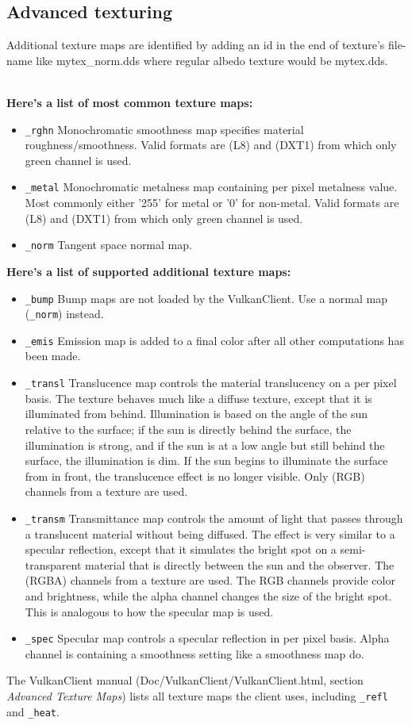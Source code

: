 \documentclass[Orbiter Developer Manual.tex]{subfiles}
\begin{document}
\subsection{Advanced texturing}
Additional texture maps are identified by adding an id in the end of texture's file-name like mytex\_norm.dds where regular albedo texture would be mytex.dds.\\\ 

\textbf{Here's a list of most common texture maps:}
\begin{itemize}
\item	\texttt{\_rghn} Monochromatic smoothness map specifies material roughness/smoothness. Valid formats are (L8) and (DXT1) from which only green channel is used.
\item	\texttt{\_metal} Monochromatic metalness map containing per pixel metalness value. Most commonly either '255' for metal or '0' for non-metal. Valid formats are (L8) and (DXT1) from which only green channel is used.
\item	\texttt{\_norm} Tangent space normal map. 
\end{itemize}

\textbf{Here's a list of supported additional texture maps:}
\begin{itemize}
\item	\texttt{\_bump} Bump maps are not loaded by the VulkanClient. Use a normal map (\texttt{\_norm}) instead.
\item	\texttt{\_emis} Emission map is added to a final color after all other computations has been made. 
\item	\texttt{\_transl} Translucence map controls the material translucency on a per pixel basis. The texture behaves much like a diffuse texture, except that it is illuminated from behind. Illumination is based on the angle of the sun relative to the surface; if the sun is directly behind the surface, the illumination is strong, and if the sun is at a low angle but still behind the surface, the illumination is dim. If the sun begins to illuminate the surface from in front, the translucence effect is no longer visible. Only (RGB) channels from a texture are used. 
\item	\texttt{\_transm} Transmittance map controls the amount of light that passes through a translucent material without being diffused. The effect is very similar to a specular reflection, except that it simulates the bright spot on a semi-transparent material that is directly between the sun and the observer. The (RGBA) channels from a texture are used. The RGB channels provide color and brightness, while the alpha channel changes the size of the bright spot. This is analogous to how the specular map is used.
\item	\texttt{\_spec} Specular map controls a specular reflection in per pixel basis. Alpha channel is containing a smoothness setting like a smoothness map do.
\end{itemize}
The VulkanClient manual (Doc/VulkanClient/VulkanClient.html, section \textit{Advanced Texture Maps}) lists all texture maps the client uses, including \texttt{\_refl} and \texttt{\_heat}.
\end{document}
